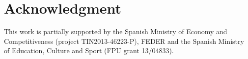 \documentclass[conference]{IEEEtran}
\begin{document}
  


  
  


\section*{Acknowledgment}
  
This  work  is  partially  supported  by  the  Spanish  Ministry  of  Economy   and   Competitiveness   (project   TIN2013-46223-P), FEDER and the Spanish Ministry of Education, Culture and Sport (FPU grant 13/04833).




\end{document}
